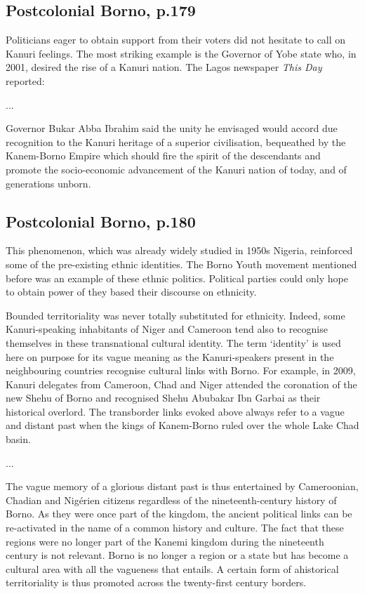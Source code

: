 \documentclass[12pt]{article}
\begin{document}
\subsection{Postcolonial Borno, p.179}

Politicians eager to obtain support from their voters did not hesitate to call
on Kanuri feelings. The most striking example is the Governor of Yobe state
who, in 2001, desired the rise of a Kanuri nation. The Lagos newspaper
\textit{This Day} reported:

...

Governor Bukar Abba Ibrahim said the unity he envisaged would accord due
recognition to the Kanuri heritage of a superior civilisation, bequeathed by the
Kanem-Borno Empire which should fire the spirit of the descendants and promote
the socio-economic advancement of the Kanuri nation of today, and of generations
unborn.

\subsection{Postcolonial Borno, p.180}

This phenomenon, which was already widely studied in 1950s Nigeria, reinforced
some of the pre-existing ethnic identities. The Borno Youth movement mentioned
before was an example of these ethnic politics. Political parties could only
hope to obtain power of they based their discourse on ethnicity. 

Bounded territoriality was never totally substituted for ethnicity. Indeed, some
Kanuri-speaking inhabitants of Niger and Cameroon tend also to recognise
themselves in these transnational cultural identity. The term `identity' is used
here on purpose for its vague meaning as the Kanuri-speakers present in the
neighbouring countries recognise cultural links with Borno. For example, in
2009, Kanuri delegates from Cameroon, Chad and Niger attended the coronation of
the new Shehu of Borno and recognised Shehu Abubakar Ibn Garbai as their
historical overlord. The transborder links evoked above always refer to a vague
and distant past when the kings of Kanem-Borno ruled over the whole Lake Chad
basin.

...

The vague memory of a glorious distant past is thus entertained by Cameroonian,
Chadian and Nigérien citizens regardless of the nineteenth-century history of
Borno. As they were once part of the kingdom, the ancient political links can be
re-activated in the name of a common history and culture. The fact that these
regions were no longer part of the Kanemi kingdom during the nineteenth century
is not relevant. Borno is no longer a region or a state but has become a
cultural area with all the vagueness that entails. A certain form of ahistorical
territoriality is thus promoted across the twenty-first century borders.
\end{document}

